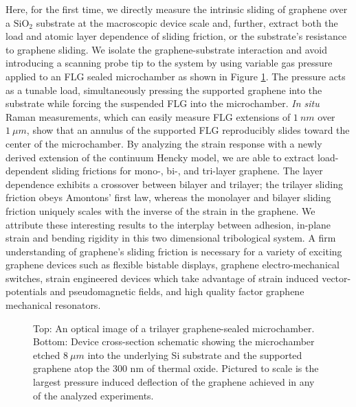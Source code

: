 Here, for the first time, we directly measure the intrinsic sliding of graphene over a $\mathrm{SiO_2}$ substrate at the macroscopic device scale and, further, extract both the load and atomic layer dependence of sliding friction, or the substrate's resistance to graphene sliding.
We isolate the graphene-substrate interaction and avoid introducing a scanning probe tip to the system by using variable gas pressure applied to an FLG sealed microchamber as shown in Figure \ref{fig:fri:device}.
The pressure acts as a tunable load, simultaneously pressing the supported graphene into the substrate while forcing the suspended FLG into the microchamber.
\emph{In situ} Raman measurements, which can easily measure FLG extensions of $1 \ nm$ over $1 \ \mu m$, show that an annulus of the supported FLG reproducibly slides toward the center of the microchamber.
By analyzing the strain response with a newly derived extension of the continuum Hencky model, we are able to extract load-dependent sliding frictions for mono-, bi-, and tri-layer graphene.
The layer dependence exhibits a crossover between bilayer and trilayer; the trilayer sliding friction obeys Amontons' first law, whereas the monolayer and bilayer sliding friction uniquely scales with the inverse of the strain in the graphene.
We attribute these interesting results to the interplay between adhesion, in-plane strain and bending rigidity in this two dimensional tribological system.
A firm understanding of graphene's sliding friction is necessary for a variety of exciting graphene devices such as flexible bistable displays\cite{Bonaccorso2010}, graphene electro-mechanical switches\cite{Milaninia2009}, strain engineered devices\cite{Pereira2009a} which take advantage of strain induced vector-potentials and pseudomagnetic fields\cite{CastroNeto2009,Guinea2009,Kitt2012}, and high quality factor graphene mechanical resonators\cite{Kim2009b,Bunch2007,Chen2009,Barton2011}.

\begin{figure}
	\begin{center}
	
	\end{center}
	\caption[Schematic of devices used to measure graphene's sliding]{\label{fig:fri:device} Top: An optical image of a trilayer graphene-sealed microchamber. Bottom: Device cross-section schematic showing the microchamber etched $8 \ \mu m$ into the underlying Si substrate and the supported graphene atop the 300 nm of thermal oxide.  Pictured to scale is the largest pressure induced deflection of the graphene achieved in any of the analyzed experiments.}
\end{figure}

